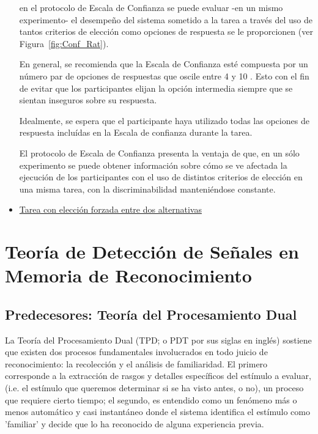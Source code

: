 \begin{itemize}
en el protocolo de Escala de Confianza se puede evaluar -en un mismo experimento- el desempeño del sistema sometido a la tarea a través del uso de tantos criterios de elección como opciones de respuesta se le proporcionen (ver Figura~\ref{fig:Conf_Rat}).

En general, se recomienda que la Escala de Confianza esté compuesta por un número par de opciones de respuestas que oscile entre 4 y 10 \parencite{McNicol2}. Esto con el fin de evitar que los participantes elijan la opción intermedia siempre que se sientan inseguros sobre su respuesta. 







Idealmente, se espera que el participante haya utilizado todas las opciones de respuesta incluídas en la Escala de confianza durante la tarea.


El protocolo de Escala de Confianza presenta la ventaja de que, en un sólo experimento se puede obtener información sobre cómo se ve afectada la ejecución de los participantes con el uso de distintos criterios de elección en una misma tarea, con la discriminabilidad manteniéndose constante. 

\parencite{McNicol2, McNicol5}

\item \underline{Tarea con elección forzada entre dos alternativas}\\





\end{itemize}











\section{Teoría de Detección de Señales en Memoria de Reconocimiento}

\subsection{Predecesores: Teoría del Procesamiento Dual}

La Teoría del Procesamiento Dual (TPD; o PDT por sus siglas en inglés) sostiene que existen dos procesos fundamentales involucrados en todo juicio de reconocimiento: la recolección y el análisis de familiaridad. El primero corresponde a la extracción de rasgos y detalles específicos del estímulo a evaluar, (i.e. el estímulo que queremos determinar si se ha visto antes, o no), un proceso que requiere cierto tiempo; el segundo, es entendido como un fenómeno más o menos automático y casi instantáneo donde el sistema identifica el estímulo como 'familiar' y decide que lo ha reconocido de alguna experiencia previa. 


